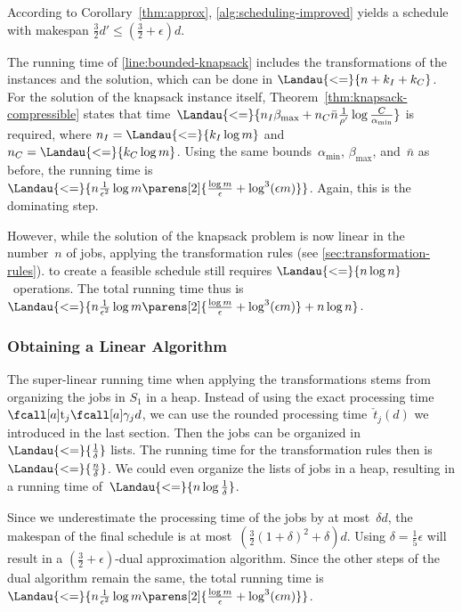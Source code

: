 According to Corollary~\ref{thm:approx},
\cref{alg:scheduling-improved} yields a schedule with makespan $\frac{3}{2}d' \leq (\frac{3}{2} + \epsilon) d$.

The running time of \cref{line:bounded-knapsack} includes the transformations of the instances
and the solution, which can be done in $\Landau{<=}{n + k_I + k_C}$.
For the solution of the knapsack instance itself,
Theorem~\ref{thm:knapsack-compressible} states that
time~$\Landau{<=}{n_I \beta_{\max} + n_C \bar{n} \frac{1}{\rho'} \log \frac{C}{\alpha_{\min}}}$ is required,
where $n_I = \Landau{<=}{k_I \log m}$ and $n_C = \Landau{<=}{k_C \log m}$.
Using the same bounds~$\alpha_{\min}$, $\beta_{\max}$, and~$\bar{n}$ as before,
the running time is~$\Landau{<=}{n \frac{1}{\epsilon^2} \log m \parens[2]{\frac{\log m}{\epsilon} + \log^3 (\epsilon m)}}$.
Again, this is the dominating step.

However, while the solution of the knapsack problem is now linear in the number~$n$ of jobs,
applying the transformation rules (see \cref{sec:transformation-rules}).
to create a feasible schedule still requires $\Landau{<=}{n \log n}$~operations.
The total running time thus is
$\Landau{<=}{n \frac{1}{\epsilon^2} \log m \parens[2]{\frac{\log m}{\epsilon} + \log^3 (\epsilon m)} + n \log n}$.


\subsubsection{Obtaining a Linear Algorithm}
\label{sec:linear}

The super-linear running time when applying the transformations
stems from organizing the jobs in $S_1$ in a heap.
Instead of using the exact processing time~$\ptm{j}{\procnum{j}{d}}$,
we can use the rounded processing time~$\check{t}_j(d)$ we introduced in the last section.
Then the jobs can be organized in~$\Landau{<=}{\frac{1}{\delta}}$ lists.
The running time for the transformation rules then is~$\Landau{<=}{\frac{n}{\delta}}$.
We could even organize the lists of jobs in a heap,
resulting in a running time of~$\Landau{<=}{n \log \frac{1}{\delta}}$.

Since we underestimate the processing time of the jobs by at most~$\delta d$,
the makespan of the final schedule is at most~$(\frac{3}{2}(1+\delta)^2 + \delta) d$.
Using $\delta = \frac{1}{5}\epsilon$ will result in a $(\frac{3}{2} + \epsilon)$-dual approximation algorithm.
Since the other steps of the dual algorithm remain the same,
the total running time is
$\Landau{<=}{n \frac{1}{\epsilon^2} \log m \parens[2]{\frac{\log m}{\epsilon} + \log^3 (\epsilon m)}}$.
